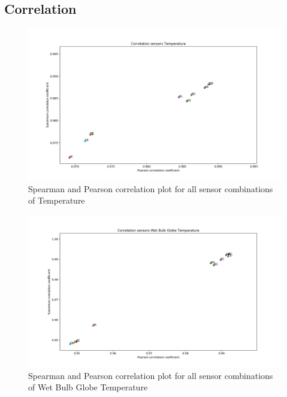 \documentclass{article}
\begin{document}
    \subsection{Correlation}
        \begin{figure}[H]
            \includegraphics[width=\textwidth]{cor_temp}
            \caption{Spearman and Pearson correlation plot for all sensor combinations of Temperature}
        \end{figure}

        \begin{figure}[H]
            \includegraphics[width=\textwidth]{cor_wbgt}
            \caption{Spearman and Pearson correlation plot for all sensor combinations of Wet Bulb Globe Temperature}
        \end{figure}
\end{document}
